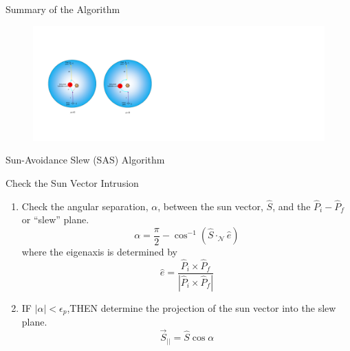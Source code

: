 \documentclass{beamer}
\begin{document}
\begin{frame}{Summary of the Algorithm}
\begin{block}{}
	\begin{figure}
		\includegraphics[width=4.85in]{./Figures/SASSchematic3}
	\end{figure}
\end{block}
\end{frame}
%
\begin{frame}{Sun-Avoidance Slew (SAS) Algorithm}
\begin{block}{Check the Sun Vector Intrusion}
\begin{enumerate}
\item Check the angular separation, $\alpha$, between the sun vector, $\hat{S}$, and the $\hat{P}_i-\hat{P}_f$ or ``slew'' plane.
\begin{equation}
\alpha=\frac{\pi}{2}-\cos^{-1}(\hat{S}\cdot_\mathcal{N}\hat{e})
\end{equation}
where the eigenaxis is determined by
\begin{equation}\label{eaxis}
\hat{e}=\frac{\hat{P}_i\times\hat{P}_f}{|\hat{P}_i\times \hat{P}_f|}
\end{equation} 

\item IF $|\alpha|<\epsilon_p$,THEN determine the projection of the sun vector into the slew plane.
\begin{equation}\label{Sbar}
\vec{S}_{||}=\hat{S}\cos\alpha
\end{equation}

\end{enumerate}
\end{block}
\end{frame}
\end{document}
